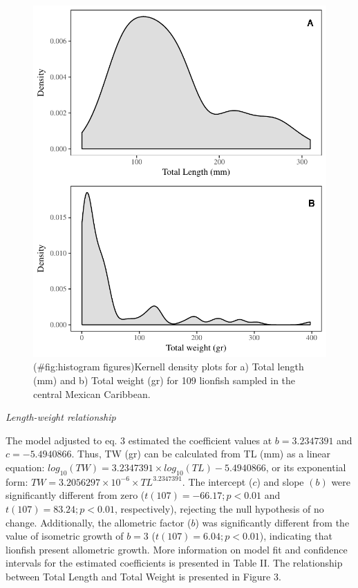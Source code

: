 \documentclass[fleqn,10pt,lineno]{wlpeerj} %
\theoremstyle{definition}
\theoremstyle{definition}
\theoremstyle{definition}
\theoremstyle{remark}
\begin{document}
\begin{figure}
\centering
\includegraphics{Manuscript_files/figure-latex/histogram figures-1.pdf}
\caption{(\#fig:histogram figures)Kernell density plots for a) Total
length (mm) and b) Total weight (gr) for 109 lionfish sampled in the
central Mexican Caribbean.}
\end{figure}

\emph{Length-weight relationship}

The model adjusted to eq. 3 estimated the coefficient values at
\(b = 3.2347391\) and \(c = -5.4940866\). Thus, TW (gr) can be
calculated from TL (mm) as a linear equation:
\(log_{10}(TW) = 3.2347391\times log_{10}(TL) -5.4940866\), or its
exponential form: \(TW = 3.2056297\times 10^{-6}\times TL^{3.2347391}\).
The intercept (\(c\)) and slope \((b)\) were significantly different
from zero (\(t(107) = -66.17; p<0.01\) and \(t(107) = 83.24; p<0.01\),
respectively), rejecting the null hypothesis of no change. Additionally,
the allometric factor (\(b\)) was significantly different from the value
of isometric growth of \(b = 3\) (\(t(107) = 6.04; p<0.01\)), indicating
that lionfish present allometric growth. More information on model fit
and confidence intervals for the estimated coefficients is presented in
Table II. The relationship between Total Length and Total Weight is
presented in Figure 3.
\end{document}

